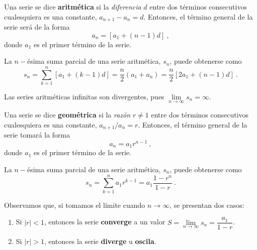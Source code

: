 \begin{defi} 
    Una serie se dice \textbf{aritmética} si la \emph{diferencia} $d$ entre dos términos consecutivos cualesquiera es una constante, $a_{n+1} - a_n = d$. Entonces, el término general de la serie será de la forma
    \begin{equation}
        a_n = [a_1 + (n-1)d] \ ,
    \end{equation}
    donde $a_1$ es el primer término de la serie.
    
    La $n-$ésima suma parcial de una serie aritmética, $s_n$, puede obtenerse como
    \begin{equation}
        s_n =  \sum_{k=1}^n [a_1 + (k-1)d] = \frac{n}{2} (a_1 + a_n) = \frac{n}{2}[2a_1 + (n-1)d] \ . 
    \end{equation}
    
    Las series aritméticas infinitas son divergentes, pues $\lim\limits_{n\to \infty} s_n = \infty$.
\end{defi}


\begin{defi} 
    Una serie se dice \textbf{geométrica} si la \emph{razón} $r \neq 1$ entre dos términos consecutivos cualesquiera es una constante, $a_{n+1}/a_n = r$. Entonces, el término general de la serie tomará la forma
    \begin{equation}
        a_n = a_1 r^{n-1} \ ,
    \end{equation}
    donde $a_1$ es el primer término de la serie.

    La $n-$ésima suma parcial de una serie aritmética, $s_n$, puede obtenerse como 
    \begin{equation}
        s_n = \sum_{k=1}^n a_1 r^{k-1} = a_1 \frac{1-r^n}{1-r} \ .
    \end{equation}

    Observamos que, si tomamos el límite cuando $n \to \infty$, se presentan dos casos:
    \begin{enumerate}
        \item Si $|r| < 1$, entonces la serie \textbf{converge} a un valor $S = \lim\limits_{n\to\infty} s_n = \dfrac{a_1}{1-r}$.
        \item Si $|r| > 1$, entonces la serie \textbf{diverge} u \textbf{oscila}.
    \end{enumerate}
\end{defi}

